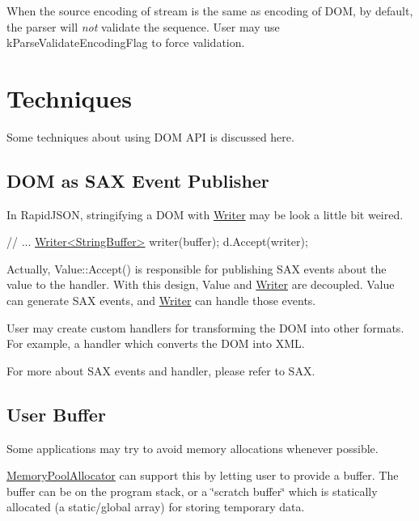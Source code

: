 When the source encoding of stream is the same as encoding of D\+OM, by default, the parser will {\itshape not} validate the sequence. User may use {\ttfamily k\+Parse\+Validate\+Encoding\+Flag} to force validation.\hypertarget{md_Commun_Externe_RapidJSON_doc_sax.zh-cn_Techniques}{}\section{Techniques}\label{md_Commun_Externe_RapidJSON_doc_sax.zh-cn_Techniques}
Some techniques about using D\+OM A\+PI is discussed here.

\subsection*{D\+OM as S\+AX Event Publisher}

In Rapid\+J\+S\+ON, stringifying a D\+OM with {\ttfamily \hyperlink{class_writer}{Writer}} may be look a little bit weired.


\begin{DoxyCode}
\textcolor{comment}{// ...}
\hyperlink{class_writer}{Writer<StringBuffer>} writer(buffer);
d.Accept(writer);
\end{DoxyCode}


Actually, {\ttfamily Value\+::\+Accept()} is responsible for publishing S\+AX events about the value to the handler. With this design, {\ttfamily Value} and {\ttfamily \hyperlink{class_writer}{Writer}} are decoupled. {\ttfamily Value} can generate S\+AX events, and {\ttfamily \hyperlink{class_writer}{Writer}} can handle those events.

User may create custom handlers for transforming the D\+OM into other formats. For example, a handler which converts the D\+OM into X\+ML.

For more about S\+AX events and handler, please refer to S\+AX.\hypertarget{md_Commun_Externe_RapidJSON_doc_dom_UserBuffer}{}\subsection{User Buffer}\label{md_Commun_Externe_RapidJSON_doc_dom_UserBuffer}
Some applications may try to avoid memory allocations whenever possible.

{\ttfamily \hyperlink{class_memory_pool_allocator}{Memory\+Pool\+Allocator}} can support this by letting user to provide a buffer. The buffer can be on the program stack, or a \char`\"{}scratch buffer\char`\"{} which is statically allocated (a static/global array) for storing temporary data.


